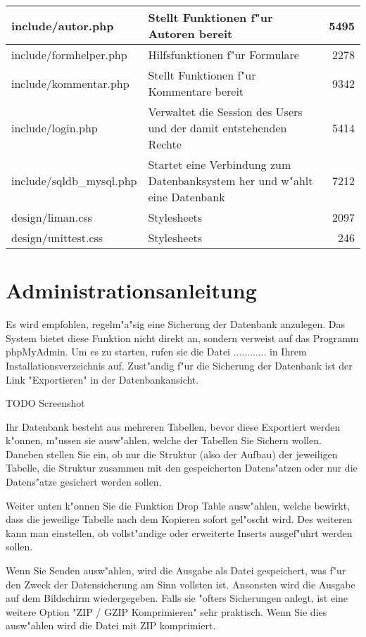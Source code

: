 \begin{longtable}{|l|p{6cm}|r|}
\hline
include/autor.php & Stellt Funktionen f"ur Autoren bereit & 5495\\
\hline
include/formhelper.php & Hilfsfunktionen f"ur Formulare & 2278\\
\hline
include/kommentar.php & Stellt Funktionen f"ur Kommentare bereit & 9342\\
\hline   
include/login.php &  Verwaltet die Session des Users und der damit entstehenden Rechte & 5414\\
\hline
include/sqldb\_mysql.php & Startet eine Verbindung zum Datenbanksystem her und w"ahlt eine Datenbank & 7212\\
\hline
design/liman.css & Stylesheets & 2097\\
\hline
design/unittest.css & Stylesheets & 246\\
\hline
\end{longtable}


\section{Administrationsanleitung}


Es wird empfohlen, regelm"a"sig eine Sicherung der Datenbank anzulegen. Das System bietet diese Funktion nicht direkt an,
sondern verweist auf das Programm phpMyAdmin. Um es zu starten, rufen sie die Datei ............ in Ihrem Installationsverzeichnis auf.
Zust"andig f"ur die Sicherung der Datenbank ist der Link "Exportieren" in der Datenbankansicht. 

{TODO Screenshot}

Ihr Datenbank besteht aus mehreren Tabellen, bevor diese Exportiert werden k"onnen, m"ussen sie ausw"ahlen, welche der Tabellen Sie Sichern wollen. 
Daneben stellen Sie ein, ob nur die Struktur 
(also der Aufbau) der jeweiligen Tabelle, die Struktur zusammen mit den gespeicherten Datens"atzen oder nur die Datens"atze gesichert werden sollen.

Weiter unten k"onnen Sie die Funktion Drop Table ausw"ahlen, welche bewirkt, dass die jeweilige Tabelle nach dem Kopieren sofort gel"oscht wird. Des weiteren 
kann man einstellen, ob vollst"andige oder erweiterte Inserts ausgef"uhrt werden sollen.  

Wenn Sie Senden ausw"ahlen, wird die Ausgabe als Datei gespeichert, was f"ur den Zweck der Datensicherung am Sinn vollsten ist. Ansonsten wird die 
Ausgabe auf dem Bildschirm wiedergegeben. 
Falls sie "ofters Sicherungen anlegt, ist eine weitere Option "ZIP / GZIP Komprimieren" sehr praktisch. Wenn Sie dies ausw"ahlen wird die Datei mit ZIP 
komprimiert.
